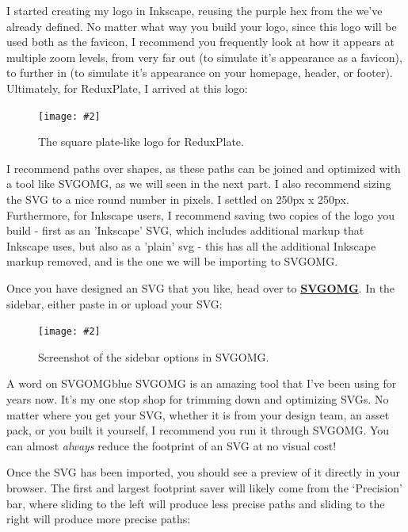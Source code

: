\documentclass[paper=6in:9in,pagesize=pdftex,headinclude=on,footinclude=on,12pt]{scrbook}
\newcommand{\link}[2]{\textbf{\textcolor{monokaiPink}{\href{#2}{#1}}}}
\newcommand{\standardfigure}[3]{\begin{figure}[H]\begin{center}\texttt{[image: \#2]}\caption{#3}\label{fig:#2}\end{center}\end{figure}}
\begin{document}

I started creating my logo in Inkscape, reusing the purple hex from the  we've already defined. No matter what way you build your logo, since this logo will be used both as the favicon, I recommend you frequently look at how it appears at multiple zoom levels, from very far out (to simulate it's appearance as a favicon), to further in (to simulate it's appearance on your homepage, header, or footer). Ultimately, for ReduxPlate, I arrived at this logo:

\standardfigure{\textwidth/2}{frontend/logo-design/logo}{The square plate-like logo for ReduxPlate.}

I recommend paths over shapes, as these paths can be joined and optimized with a tool like SVGOMG, as we will seen in the next part. I also recommend sizing the SVG to a nice round number in pixels. I settled on 250px x 250px. Furthermore, for Inkscape users, I recommend saving two copies of the logo you build - first as an 'Inkscape' SVG, which includes additional markup that Inkscape uses, but also as a 'plain' svg - this has all the additional Inkscape markup removed, and is the one we will be importing to SVGOMG.


Once you have designed an SVG that you like, head over to \link{SVGOMG}{https://jakearchibald.github.io/svgomg/}. In the sidebar, either paste in or upload your SVG:

\standardfigure{\textwidth}{frontend/logo-design/svgomg-sidebar}{Screenshot of the sidebar options in SVGOMG.}

\begin{highlightBox}{A word on SVGOMG}{blue}{\information}
SVGOMG is an amazing tool that I've been using for years now. It's my one stop shop for trimming down and optimizing SVGs. No matter where you get your SVG, whether it is from your design team, an asset pack, or you built it yourself, I recommend you run it through SVGOMG. You can almost \textit{always} reduce the footprint of an SVG at no visual cost!
\end{highlightBox}

Once the SVG has been imported, you should see a preview of it directly in your browser. The first and largest footprint saver will likely come from the `Precision' bar, where sliding to the left will produce less precise paths and sliding to the right will produce more precise paths:
\end{document}
